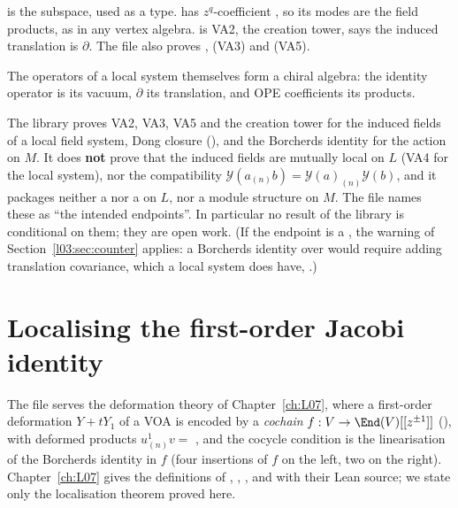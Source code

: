 \begin{dictionary}
 is the subspace, used as a type.  has $z^q$-coefficient
, so its modes are the field products, as in any vertex algebra.
 is VA2,  the creation tower,  says the
induced translation is $\partial$. The file also proves , 
(VA3) and  (VA5).
\end{dictionary}

\begin{physics}
The operators of a local system themselves form a chiral algebra: the identity operator is its vacuum,
$\partial$ its translation, and OPE coefficients its products.
\end{physics}

\begin{warning}[title={Li's construction is not complete at this commit}]
The library proves VA2, VA3, VA5 and the creation tower for the induced fields of a local field
system, Dong closure (), and the Borcherds identity for the action
on $M$. It does \textbf{not} prove that the induced fields  are mutually local on
$L$ (VA4 for the local system), nor the compatibility $\mathcal Y(a_{(n)}b) = \mathcal Y(a)_{(n)}\mathcal Y(b)$,
and it packages neither a  nor a  on $L$, nor a module structure on
$M$. The file  names these as ``the intended endpoints''. In
particular no result of the library is conditional on them; they are open work. (If the endpoint is
a , the warning of Section~\ref{l03:sec:counter} applies: a Borcherds identity over
 would require adding translation covariance, which a local system does have,
.)
\end{warning}

\section{Localising the first-order Jacobi identity}\label{l03:sec:jacobilocal}

The file  serves the deformation theory of
Chapter~\ref{ch:L07}, where a first-order deformation $Y+tY_1$ of a VOA is encoded by a
\emph{cochain} $f:V\to\End(V)[[z^{\pm1}]]$ (), with deformed products
$u^1_{(n)}v = $ , and the cocycle condition  is the linearisation
of the Borcherds identity in $f$ (four insertions of $f$ on the left, two on the right). Chapter~\ref{ch:L07}
gives the definitions of , , ,  and
 with their Lean source; we state only the localisation theorem proved here.

